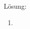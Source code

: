 \documentclass[../main.tex]{subfiles}
\begin{document}
\begin{enumerate}
	      Lösung:
	      \begin{enumerate}
		      \item
	      \end{enumerate}
\end{enumerate}
\end{document}
